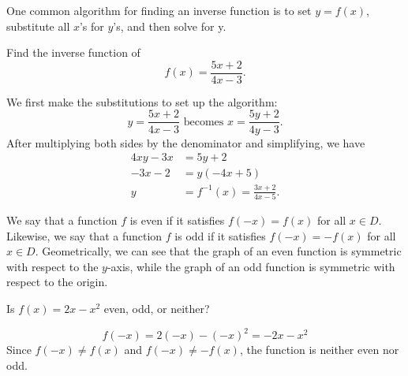 One common algorithm for finding an inverse function is to set $y = f(x)$, substitute all $x$'s for $y$'s, and then solve for y.
\begin{example}
    Find the inverse function of 
    \begin{equation*}
        f(x) = \frac{5x + 2}{4x - 3}.
    \end{equation*}
\end{example}
\begin{answer}
    We first make the substitutions to set up the algorithm:
    \begin{equation*}
        y = \frac{5x + 2}{4x - 3} \text{ becomes } x = \frac{5y + 2}{4y - 3}.
    \end{equation*}
    After multiplying both sides by the denominator and simplifying, we have
    \begin{align*}
        4xy - 3x &= 5y + 2 \\
        -3x - 2 &= y(-4x + 5) \\
        y &= f^{-1}(x) = \frac{3x + 2}{4x - 5}.
    \end{align*}
\end{answer}

We say that a function $f$ is even if it satisfies $f(-x) = f(x)$ for all $x \in D$.
Likewise, we say that a function $f$ is odd if it satisfies $f(-x) = -f(x)$ for all $x \in D$. 
Geometrically, we can see that the graph of an even function is symmetric with respect to the $y$-axis, while the graph of an odd function is symmetric with respect to the origin. 

\begin{example}
    Is $f(x) = 2x - x^2$ even, odd, or neither?
\end{example}
\begin{answer}
    \begin{equation*}
        f(-x) = 2(-x) - (-x)^2 = -2x - x^2
    \end{equation*}
    Since $f(-x) \neq f(x)$ and $f(-x) \neq -f(x)$, the function is neither even nor odd.
\end{answer}